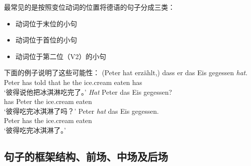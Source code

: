 最常见的是按照变位动词的位置将德语的句子分成三类：
\begin{itemize}
\item 动词位于末位的小句
\item 动词位于首位的小句
\item 动词位于第二位（V2）的小句
\end{itemize}
%
下面的例子说明了这些可能性：
\eal
\ex 
\gll (Peter hat erzählt,) dass er das Eis gegessen \emph{hat}.\\
     Peter has told that he the ice.cream eaten has\\
\glt `彼得说他把冰淇淋吃完了。'
\ex 
\gll \emph{Hat} Peter das Eis gegessen?\\
	 has Peter the ice.cream eaten\\
\glt `彼得吃完冰淇淋了吗？'
\ex 
\gll Peter \emph{hat} das Eis gegessen.\\
	 Peter has the ice.cream eaten\\
\glt `彼得吃完冰淇淋了。'
\zl


\subsection{句子的框架结构、前场、中场及后场}

